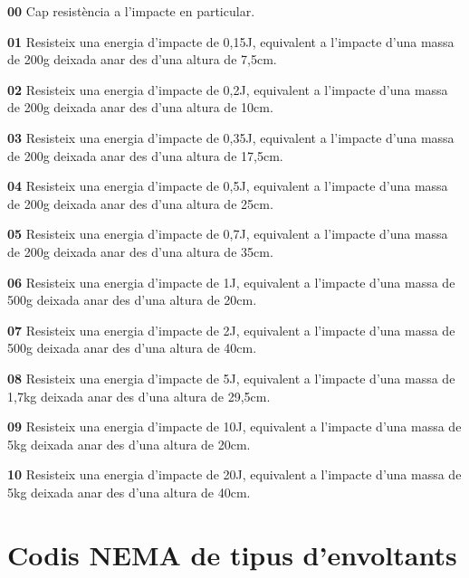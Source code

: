 \begin{list}{}
   {\setlength{\labelwidth}{10mm} \setlength{\leftmargin}{10mm} \setlength{\labelsep}{2mm}}
   \item[\textbf{00}] Cap resist\`{e}ncia a l'impacte en particular.
   \item[\textbf{01}] Resisteix una energia d'impacte de 0{,}15\unit{J}, equivalent a l'impacte d'una massa de 200\unit{g} deixada anar des d'una altura de 7{,}5\unit{cm}.
   \item[\textbf{02}] Resisteix una energia d'impacte de 0{,}2\unit{J}, equivalent a l'impacte d'una massa de 200\unit{g} deixada anar des d'una altura de 10\unit{cm}.
   \item[\textbf{03}] Resisteix una energia d'impacte de 0{,}35\unit{J}, equivalent a l'impacte d'una massa de 200\unit{g} deixada anar des d'una altura de 17{,}5\unit{cm}.
   \item[\textbf{04}] Resisteix una energia d'impacte de 0{,}5\unit{J}, equivalent a l'impacte d'una massa de 200\unit{g} deixada anar des d'una altura de 25\unit{cm}.
   \item[\textbf{05}] Resisteix una energia d'impacte de 0{,}7\unit{J}, equivalent a l'impacte d'una massa de 200\unit{g} deixada anar des d'una altura de 35\unit{cm}.
   \item[\textbf{06}]Resisteix una energia d'impacte de 1\unit{J}, equivalent a l'impacte d'una massa de 500\unit{g} deixada anar des d'una altura de 20\unit{cm}.
   \item[\textbf{07}]Resisteix una energia d'impacte de 2\unit{J}, equivalent a l'impacte d'una massa de 500\unit{g} deixada anar des d'una altura de 40\unit{cm}.
   \item[\textbf{08}]Resisteix una energia d'impacte de 5\unit{J}, equivalent a l'impacte d'una massa de 1{,}7\unit{kg} deixada anar des d'una altura de 29{,}5\unit{cm}.
   \item[\textbf{09}]Resisteix una energia d'impacte de 10\unit{J}, equivalent a l'impacte d'una massa de 5\unit{kg} deixada anar des d'una altura de 20\unit{cm}.
   \item[\textbf{10}]Resisteix una energia d'impacte de 20\unit{J}, equivalent a l'impacte d'una massa de 5\unit{kg} deixada anar des d'una altura de 40\unit{cm}.
\end{list}



\section{Codis NEMA de tipus d'envoltants}
 

